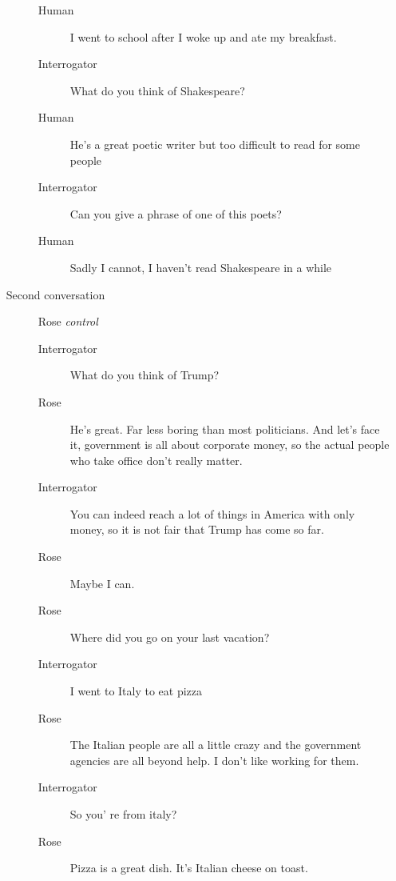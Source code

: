 \begin{itemize}
\begin{description}
\begin{description}
               \item [Human] I went to school after I woke up and ate my breakfast.
               \item [Interrogator] What do you think of Shakespeare?
               \item [Human] He's a great poetic writer but too difficult to read for some people
               \item [Interrogator] Can you give a phrase of one of this poets?
               \item [Human] Sadly I cannot, I haven't read Shakespeare in a while
            \end{description}
         \item [Second conversation] Rose \textit{control}
            \begin{description}
               \item [Interrogator] What do you think of Trump?
               \item [Rose] He's great. Far less boring than most politicians. And let's face it, government is all about corporate money, so the actual people who take office don't really matter.
               \item [Interrogator] You can indeed reach a lot of things in America with only money, so it is not fair that Trump has come so far.
               \item [Rose] Maybe I can.
               \item [Rose] Where did you go on your last vacation?
               \item [Interrogator] I went to Italy to eat pizza
               \item [Rose] The Italian people are all a little crazy and the government agencies are all beyond help. I don't like working for them.
               \item [Interrogator] So you' re from italy?
               \item [Rose] Pizza is a great dish. It's Italian cheese on toast.
            \end{description}
      \end{description}


\end{itemize}
